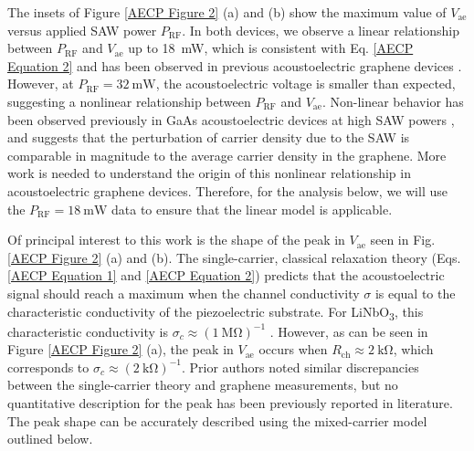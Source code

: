 \documentclass[double,12pt,1in,seploa]{beavtex}
\begin{document}
The insets of Figure \ref{AECP Figure 2} (a) and (b) show the maximum value of $V_{\mathrm{ae}}$ versus applied SAW power $P_{\mathrm{RF}}$. In both devices, we observe a linear relationship between $P_{\mathrm{RF}}$ and $V_{\mathrm{ae}}$ up to \SI{18}{\milli\watt}, which is consistent with Eq. \ref{AECP Equation 2} and has been observed in previous acoustoelectric graphene devices \cite{bandhu_macroscopic_2013}. However, at $P_{\mathrm{RF}}=\SI{32}{\milli\watt}$, the acoustoelectric voltage is smaller than expected, suggesting a nonlinear relationship between $P_{\mathrm{RF}}$ and $V_{\mathrm{ae}}$. Non-linear behavior has been observed previously in GaAs acoustoelectric devices at high SAW powers \cite{rotter_nonlinear_1999}, and suggests that the perturbation of carrier density due to the SAW is comparable in magnitude to the average carrier density in the graphene. More work is needed to understand the origin of this nonlinear relationship in acoustoelectric graphene devices. Therefore, for the analysis below, we will use the $P_{\mathrm{RF}} = \SI{18}{\milli\watt}$ data to ensure that the linear model is applicable. 

Of principal interest to this work is the shape of the peak in $V_{\mathrm{ae}}$ seen in Fig. \ref{AECP Figure 2} (a) and (b). The single-carrier, classical relaxation theory (Eqs. \ref{AECP Equation 1} and \ref{AECP Equation 2}) predicts that the acoustoelectric signal should reach a maximum when the channel conductivity $\sigma$ is equal to the characteristic conductivity of the piezoelectric substrate. For LiNbO\textsubscript{3}, this characteristic conductivity is $\sigma_c \approx (\SI{1}{\mega\ohm})^{-1}$ \cite{wixforth_surface_1989,rotter_giant_1998}. However, as can be seen in Figure \ref{AECP Figure 2} (a), the peak in $V_{\mathrm{ae}}$ occurs when $R_{\mathrm{ch}} \approx \SI{2}{\kilo\ohm}$, which corresponds to $\sigma_c \approx (\SI{2}{\kilo\ohm})^{-1}$. Prior authors noted similar discrepancies between the single-carrier theory and graphene measurements, but no quantitative description for the peak has been previously reported in literature. The peak shape can be accurately described using the mixed-carrier model outlined below.
\end{document}
